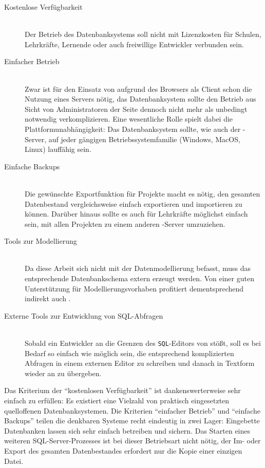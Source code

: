 \begin{description}  
\item[Kostenlose Verfügbarkeit] \hfill \\
  Der Betrieb des Datenbanksystems soll nicht mit Lizenzkosten für Schulen, Lehrkräfte, Lernende oder auch freiwillige Entwickler verbunden sein.
\item[Einfacher Betrieb] \hfill \\
  Zwar ist für den Einsatz von \idename{} aufgrund des Browsers als Client schon die Nutzung eines Servers nötig, das Datenbanksystem sollte den Betrieb aus Sicht von Administratoren der Seite dennoch nicht mehr als unbedingt notwendig verkomplizieren. Eine wesentliche Rolle spielt dabei die Plattformunabhängigkeit: Das Datenbanksystem sollte, wie auch der \idename{}-Server, auf jeder gängigen Betriebssystemfamilie (Windows, MacOS, Linux) lauffähig sein.
\item[Einfache Backups] \hfill \\
  Die gewünschte Exportfunktion für Projekte macht es nötig, den gesamten Datenbestand vergleichsweise einfach exportieren und importieren zu können. Darüber hinaus sollte es auch für Lehrkräfte möglichst einfach sein, mit allen Projekten zu einem anderen \idename{}-Server umzuziehen.
\item[Tools zur Modellierung] \hfill \\
  Da diese Arbeit sich nicht mit der Datenmodellierung befasst, muss das entsprechende Datenbankschema extern erzeugt werden. Von einer guten Unterstützung für Modellierungsvorhaben profitiert dementsprechend indirekt auch \idename.
\item[Externe Tools zur Entwicklung von SQL-Abfragen] \hfill \\
  Sobald ein Entwickler an die Grenzen des \texttt{SQL}-Editors von \idename{} stößt, soll es bei Bedarf so einfach wie möglich sein, die entsprechend komplizierten Abfragen in einem externen Editor zu schreiben und danach in Textform wieder an \idename{} zu übergeben.
\end{description}

Das Kriterium der "`kostenlosen Verfügbarkeit"' ist dankenswerterweise sehr einfach zu erfüllen: Es existiert eine Vielzahl von praktisch eingesetzten quelloffenen Datenbanksystemen. Die Kriterien "`einfacher Betrieb"' und "`einfache Backups"' teilen die denkbaren Systeme recht eindeutig in zwei Lager: Eingebette Datenbanken lassen sich sehr einfach betreiben und sichern. Das Starten eines weiteren SQL-Server-Prozesses ist bei dieser Betriebsart nicht nötig, der Im- oder Export des gesamten Datenbestandes erfordert nur die Kopie einer einzigen Datei.

